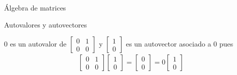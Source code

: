 \begin{chapter}{\'Algebra de matrices}
\begin{section}{Autovalores y autovectores}
        \begin{ejemplo*}
        $0$ es un autovalor de  
        $\left[\begin{array}{cc}
                    0&1\\0&0
                    \end{array}
        \right]$
        y $\left[\begin{array}{c}
                    1\\0
                    \end{array}
        \right]$ es un autovector asociado a $0$ pues
        \begin{align*}
        \left[\begin{array}{cc}
                    0&1\\0&0
                    \end{array}
        \right]
        \left[
        \begin{array}{c}
        1\\0 
        \end{array}
        \right]
        =
        \left[
        \begin{array}{c}
        0\\0 
        \end{array}
        \right]=
        0\left[
        \begin{array}{c}
        1\\0 
        \end{array}
        \right]
        \end{align*}
        \end{ejemplo*}


\end{section}
\end{chapter}

